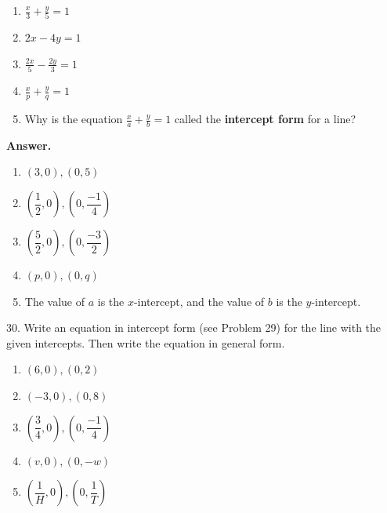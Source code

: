 \documentclass[10pt,]{book}
\newcommand{\terminology}[1]{\textbf{#1}}
\theoremstyle{plain}
\theoremstyle{definition}
\theoremstyle{definition}
\theoremstyle{definition}
\theoremstyle{definition}
\numberwithin{equation}{part}
\begin{document}
\begin{exerciselist}
\begin{multicols}{2}
\begin{enumerate}[label=\alph*]
\item\hypertarget{li-212}{}\(\displaystyle{\frac{x}{3}+\frac{y}{5}=1} \)%
\item\hypertarget{li-213}{}\(\displaystyle{2x - 4y = 1} \)%
\item\hypertarget{li-214}{}\(\displaystyle{\frac{2x}{5}-\frac{2y}{3}=1} \)%
\item\hypertarget{li-215}{}\(\displaystyle{\frac{x}{p}+\frac{y}{q}=1} \)%
\item\hypertarget{li-216}{}Why is the equation \(\displaystyle{\frac{x}{a}+\frac{y}{b}=1} \) called the \terminology{intercept form} for a line?%
\end{enumerate}
\end{multicols}
\par\smallskip
\par\smallskip
\noindent\textbf{Answer.}\hypertarget{answer-22}{}\quad
\leavevmode%
\begin{multicols}{2}
\begin{enumerate}[label=\alph*]
\item\hypertarget{li-217}{}\((3,0), (0,5) \)%
\item\hypertarget{li-218}{}\(\left(\dfrac{1}{2},0\right), \left(0,\dfrac{-1}{4}\right) \)%
\item\hypertarget{li-219}{}\(\left(\dfrac{5}{2},0\right), \left(0,\dfrac{-3}{2}\right) \)%
\item\hypertarget{li-220}{}\((p,0), (0,q) \)%
\item\hypertarget{li-221}{}The value of \(a\) is the \(x\)-intercept, and the value of \(b\) is the \(y\)-intercept.%
\end{enumerate}
\end{multicols}
%
\item[30.]\hypertarget{exercise-37}{}Write an equation in intercept form (see Problem 29) for the line with the given intercepts. Then write the equation in general form.%
\leavevmode%
\begin{multicols}{2}
\begin{enumerate}[label=\alph*]
\item\hypertarget{li-222}{}\((6, 0), (0, 2) \)%
\item\hypertarget{li-223}{}\((-3, 0), (0, 8) \)%
\item\hypertarget{li-224}{}\(\left(\dfrac{3}{4}, 0\right), \left(0, \dfrac{-1}{4}\right) \)%
\item\hypertarget{li-225}{}\((v, 0), (0, -w) \)%
\item\hypertarget{li-226}{}\(\left(\dfrac{1}{H}, 0\right), \left(0, \dfrac{1}{T}\right) \)%

\end{enumerate}
\end{multicols}
\end{exerciselist}
\end{document}
